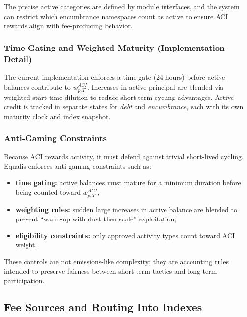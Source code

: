 \documentclass[version=preprint]{iacrcc}
\begin{document}
The precise active categories are defined by module interfaces, and the system can restrict which encumbrance namespaces count as active to ensure ACI rewards align with fee-producing behavior.

\subsubsection{Time-Gating and Weighted Maturity (Implementation Detail)}
The current implementation enforces a time gate (24 hours) before active balances contribute to $w^{ACI}_{p,T}$. Increases in active principal are blended via weighted start-time dilution to reduce short-term cycling advantages. Active credit is tracked in separate states for \emph{debt} and \emph{encumbrance}, each with its own maturity clock and index snapshot.

\subsubsection{Anti-Gaming Constraints}

Because ACI rewards activity, it must defend against trivial short-lived cycling. Equalis enforces anti-gaming constraints such as:
\begin{itemize}
  \item \textbf{time gating:} active balances must mature for a minimum duration before being counted toward $w^{ACI}_{p,T}$,
  \item \textbf{weighting rules:} sudden large increases in active balance are blended to prevent ``warm-up with dust then scale'' exploitation,
  \item \textbf{eligibility constraints:} only approved activity types count toward ACI weight.
\end{itemize}

These controls are not emissions-like complexity; they are accounting rules intended to preserve fairness between short-term tactics and long-term participation.

\subsection{Fee Sources and Routing Into Indexes}
\end{document}

